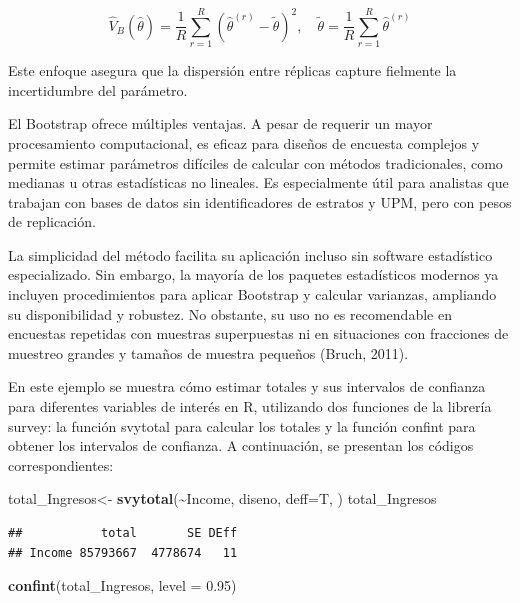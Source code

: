 \documentclass[
  spanish,
  12pt,
]{book}
\newenvironment{Shaded}{\begin{snugshade}}{\end{snugshade}}
\newcommand{\AttributeTok}[1]{\textcolor[rgb]{0.13,0.29,0.53}{#1}}
\newcommand{\FloatTok}[1]{\textcolor[rgb]{0.00,0.00,0.81}{#1}}
\newcommand{\FunctionTok}[1]{\textcolor[rgb]{0.13,0.29,0.53}{\textbf{#1}}}
\newcommand{\NormalTok}[1]{#1}
\newcommand{\OtherTok}[1]{\textcolor[rgb]{0.56,0.35,0.01}{#1}}
\newcommand{\SpecialCharTok}[1]{\textcolor[rgb]{0.81,0.36,0.00}{\textbf{#1}}}
\begin{document}
\[
\hat{V}_B(\hat{\theta}) = \frac{1}{R} \sum_{r=1}^{R} \left(\hat{\theta}^{(r)} - \tilde{\theta}\right)^2, \quad
\tilde{\theta} = \frac{1}{R} \sum_{r=1}^{R} \hat{\theta}^{(r)}
\]

Este enfoque asegura que la dispersión entre réplicas capture fielmente la incertidumbre del parámetro.

El Bootstrap ofrece múltiples ventajas. A pesar de requerir un mayor procesamiento computacional, es eficaz para diseños de encuesta complejos y permite estimar parámetros difíciles de calcular con métodos tradicionales, como medianas u otras estadísticas no lineales. Es especialmente útil para analistas que trabajan con bases de datos sin identificadores de estratos y UPM, pero con pesos de replicación.

La simplicidad del método facilita su aplicación incluso sin software estadístico especializado. Sin embargo, la mayoría de los paquetes estadísticos modernos ya incluyen procedimientos para aplicar Bootstrap y calcular varianzas, ampliando su disponibilidad y robustez. No obstante, su uso no es recomendable en encuestas repetidas con muestras superpuestas ni en situaciones con fracciones de muestreo grandes y tamaños de muestra pequeños (Bruch, 2011).

En este ejemplo se muestra cómo estimar totales y sus intervalos de confianza para diferentes variables de interés en R, utilizando dos funciones de la librería survey: la función svytotal para calcular los totales y la función confint para obtener los intervalos de confianza. A continuación, se presentan los códigos correspondientes:

\begin{Shaded}
\begin{Highlighting}[]
\NormalTok{total\_Ingresos}\OtherTok{\textless{}{-}} \FunctionTok{svytotal}\NormalTok{(}\SpecialCharTok{\textasciitilde{}}\NormalTok{Income, diseno, }\AttributeTok{deff=}\NormalTok{T, )}
\NormalTok{total\_Ingresos}
\end{Highlighting}
\end{Shaded}

\begin{verbatim}
##           total       SE DEff
## Income 85793667  4778674   11
\end{verbatim}

\begin{Shaded}
\begin{Highlighting}[]
\FunctionTok{confint}\NormalTok{(total\_Ingresos, }\AttributeTok{level =} \FloatTok{0.95}\NormalTok{)}
\end{Highlighting}
\end{Shaded}
\end{document}
